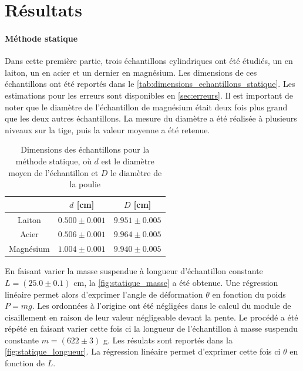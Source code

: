 \section{Résultats}

\paragraph{Méthode statique}
Dans cette première partie, trois échantillons cylindriques ont été étudiés, un en laiton, un en acier et un dernier en magnésium. Les dimensions de ces échantillons ont été reportés dans le \autoref{tab:dimensions_echantillons_statique}. Les estimations pour les erreurs sont disponibles en \autoref{sec:erreurs}. Il est important de noter que le diamètre de l'échantillon de magnésium était deux fois plus grand que les deux autres échantillons. La mesure du diamètre a été réalisée à plusieurs niveaux sur la tige, puis la valeur moyenne a été retenue.

\begin{table}[h]
    \centering
    \begin{tabulary}{0.9\linewidth}{c C C}
        \toprule
        & $d$ [\si{\centi\meter}] & $D$ [\si{\centi\meter}] \\
        \midrule
        Laiton & $0.500 \pm 0.001$ & $9.951 \pm 0.005$ \\
        Acier & $0.506 \pm 0.001$ & $9.964 \pm 0.005$ \\
        Magnésium & $1.004 \pm 0.001$ & $9.940 \pm 0.005$ \\
        \bottomrule
    \end{tabulary}
    \caption{Dimensions des échantillons pour la méthode statique, où $d$ est le diamètre moyen de l'échantillon et $D$ le diamètre de la poulie}
    \label{tab:dimensions_echantillons_statique}
\end{table}

En faisant varier la masse suspendue à longueur d'échantillon constante $L=(25.0 \pm 0.1)$ \si{\centi\meter}, la \autoref{fig:statique_masse} a été obtenue. Une régression linéaire permet alors d'exprimer l'angle de déformation $\theta$ en fonction du poids $P=mg$. Les ordonnées à l'origine ont été négligées dans le calcul du module de cisaillement en raison de leur valeur négligeable devant la pente. Le procédé a été répété en faisant varier cette fois ci la longueur de l'échantillon à masse suspendu constante $m=(622 \pm 3)$ \si{\gram}. Les résulats sont reportés dans la \autoref{fig:statique_longueur}. La régression linéaire permet d'exprimer cette fois ci $\theta$ en fonction de $L$.

